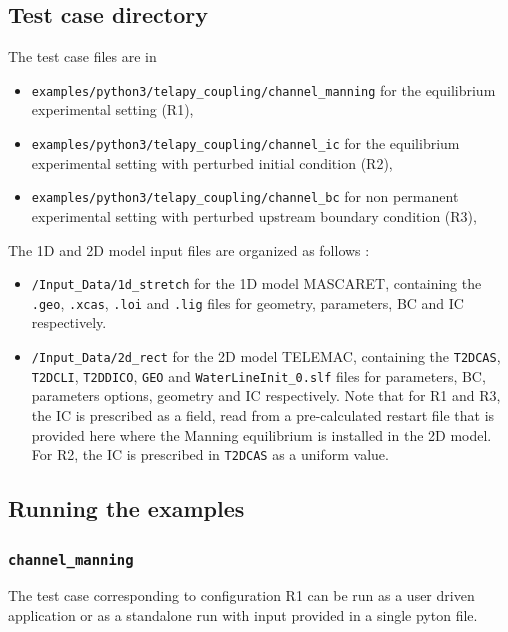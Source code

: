 \subsection{Test case directory}

The test case files are in
\begin{itemize}
\item \texttt{examples/python3/telapy\_coupling/channel\_manning} for
  the equilibrium experimental setting (R1),
\item \texttt{examples/python3/telapy\_coupling/channel\_ic} for the
  equilibrium experimental setting with perturbed initial condition
  (R2),
\item \texttt{examples/python3/telapy\_coupling/channel\_bc} for non
  permanent experimental setting with perturbed upstream boundary
  condition (R3),
\end{itemize}

The 1D and 2D model input files are organized as follows :
\begin{itemize}
\item \texttt{/Input\_Data/1d\_stretch} for the 1D model MASCARET,
  containing the \texttt{.geo}, \texttt{.xcas}, \texttt{.loi} and
  \texttt{.lig} files for geometry, parameters, BC and IC
  respectively.
\item \texttt{/Input\_Data/2d\_rect} for the 2D model TELEMAC,
  containing the \texttt{T2DCAS}, \texttt{T2DCLI}, \texttt{T2DDICO},
  \texttt{GEO} and \texttt{WaterLineInit\_0.slf} files for parameters,
  BC, parameters options, geometry and IC respectively. Note that for
  R1 and R3, the IC is prescribed as a field, read from a
  pre-calculated restart file that is provided here where the Manning
  equilibrium is installed in the 2D model. For R2, the IC is
  prescribed in \texttt{T2DCAS} as a uniform value.
\end{itemize}

\subsection{Running the examples}

\subsubsection{\texttt{channel\_manning}}\label{exe:channel_manning}
The test case corresponding to configuration R1 can be run as a user
driven application or as a standalone run with input provided in a
single pyton file.\\

